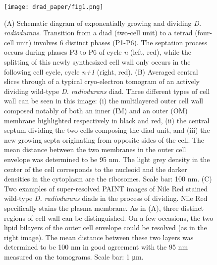 \begin{figure}
    \centering
    \texttt{[image: drad\_paper/fig1.png]}
    \label{drad_fig1}
\end{figure}
\begin{figure}
    \ContinuedFloat
    \caption[]{(A) Schematic diagram of exponentially growing and dividing \textit{D. radiodurans}. Transition from a diad (two-cell unit) to a tetrad (four-cell unit) involves 6 distinct phases (P1-P6). The septation process occurs during phases P3 to P6 of cycle \textit{n} (left, red), while the splitting of this newly synthesized cell wall only occurs in the following cell cycle, cycle \textit{n+1} (right, red). (B) Averaged central slices through of a typical cryo-electron tomogram of an actively dividing wild-type \textit{D. radiodurans} diad. Three different types of cell wall can be seen in this image: (i) the multilayered outer cell wall composed notably of both an inner (IM) and an outer (OM) membrane highlighted respectively in black and red, (ii) the central septum dividing the two cells composing the diad unit, and (iii) the new growing septa originating from opposite sides of the cell. The mean distance between the two membranes in the outer cell envelope was determined to be 95 nm. The light grey density in the center of the cell corresponds to the nucleoid and the darker densities in the cytoplasm are the ribosomes. Scale bar: 100 nm. (C) Two examples of super-resolved PAINT images of Nile Red stained wild-type \textit{D. radiodurans} diads in the process of dividing. Nile Red specifically stains the plasma membrane. As in (A), three distinct regions of cell wall can be distinguished. On a few occasions, the two lipid bilayers of the outer cell envelope could be resolved (as in the right image). The mean distance between these two layers was determined to be 100 nm in good agreement with the 95 nm measured on the tomograms. Scale bar: 1 μm.}
\end{figure}

